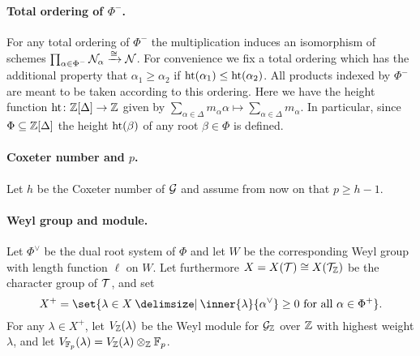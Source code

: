 \paragraph{Total ordering of $\Phi^{-}$.} For any total ordering of $\Phi^-$ the multiplication induces an isomorphism of schemes $\prod_{\alpha \in \Phi^-} \mathcal{N}_\alpha \xrightarrow{\cong} \mathcal{N}$. For convenience we fix a total ordering which has the additional property that $\alpha_1 \geq \alpha_2$ if $\operatorname{ht}(\alpha_1) \leq \operatorname{ht}(\alpha_2)$. All products indexed by $\Phi^-$ are meant to be taken according to this ordering. Here we have the height function $\operatorname{ht} \colon \mathbb{Z}[\Delta] \to \mathbb{Z}$ given by $\sum_{\alpha \in \Delta} m_\alpha \alpha \mapsto \sum_{\alpha \in \Delta} m_\alpha$. In particular, since $\Phi \subseteq \mathbb{Z}[\Delta]$ the height $\operatorname{ht}(\beta)$ of any root $\beta \in \Phi$ is defined.

\paragraph{Coxeter number and $p$.} Let $h$ be the Coxeter number of $\mathcal{G}$ and assume from now on that $p \geq h-1$.

\paragraph{Weyl group and module.} Let $\Phi^{\vee}$ be the dual root system of $\Phi$ and let $W$ be the corresponding Weyl group with length function $\ell$ on $W$. Let furthermore $X = X(\mathcal{T}) \cong X(\mathcal{T}_{\mathbb{Z}})$ be the character group of $\mathcal{T}$, and set
\begin{equation*}
  X^{+} = \set{\lambda \in X \given \inner{\lambda}{\alpha^\vee} \geq 0 \text{ for all } \alpha \in \Phi^+}.
\end{equation*}%
%
For any $\lambda \in X^+$, let $V_{\mathbb{Z}}(\lambda)$ be the Weyl module for $\mathcal{G}_{\mathbb{Z}}$ over $\mathbb{Z}$ with highest weight $\lambda$, and let $V_{\mathbb{F}_{p}}(\lambda) = V_{\mathbb{Z}}(\lambda) \otimes_{\mathbb{Z}} \mathbb{F}_{p}$.

